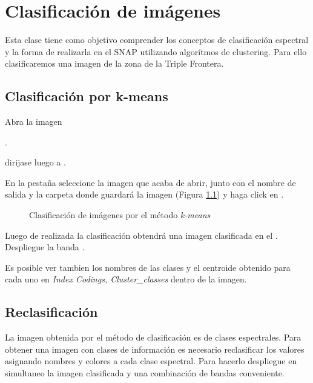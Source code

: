 \chapter{Clasificación de imágenes}

Esta clase tiene como objetivo comprender los conceptos de clasificación espectral y la forma de realizarla en el SNAP utilizando algorítmos de clustering. Para ello clasificaremos una imagen de la zona de la Triple Frontera.

\section{Clasificación por k-means}

Abra la imagen

\begin{center}
.
\end{center}

dirijase luego a .

En la pestaña  seleccione la imagen que acaba de abrir, junto con el nombre de salida y la carpeta donde guardará la imagen (Figura \ref{fig:kmeans}) y haga click en .

\begin{figure}[h!]
    \centering
    \hspace{1cm}
    \caption{Clasificación de imágenes por el método \emph{k-means}}
    \label{fig:kmeans}
\end{figure}

Luego de realizada la clasificación obtendrá una imagen clasificada en el . Despliegue la banda .

Es posible ver tambien los nombres de las clases y el centroide obtenido para cada uno en \emph{Index Codings, Cluster\_classes} dentro de la imagen.

\section{Reclasificación}

La imagen obtenida por el método de clasificación es de clases espectrales. Para obtener una imagen con clases de información es necesario reclasificar los valores asignando nombres y colores a cada clase espectral. Para hacerlo despliegue en simultaneo la imagen clasificada y una combinación de bandas conveniente.

